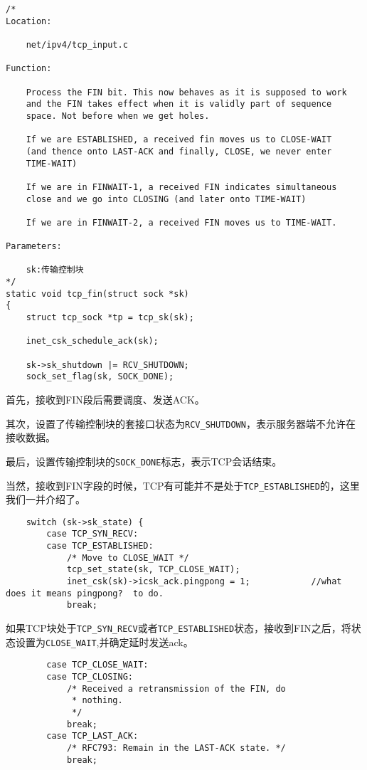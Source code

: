 \begin{verbatim}
/*
Location:

    net/ipv4/tcp_input.c

Function:

    Process the FIN bit. This now behaves as it is supposed to work
    and the FIN takes effect when it is validly part of sequence
    space. Not before when we get holes.
 
    If we are ESTABLISHED, a received fin moves us to CLOSE-WAIT
    (and thence onto LAST-ACK and finally, CLOSE, we never enter
    TIME-WAIT)
 
    If we are in FINWAIT-1, a received FIN indicates simultaneous
    close and we go into CLOSING (and later onto TIME-WAIT)
 
    If we are in FINWAIT-2, a received FIN moves us to TIME-WAIT.

Parameters:

    sk:传输控制块
*/
static void tcp_fin(struct sock *sk)
{
    struct tcp_sock *tp = tcp_sk(sk);

    inet_csk_schedule_ack(sk);

    sk->sk_shutdown |= RCV_SHUTDOWN;
    sock_set_flag(sk, SOCK_DONE);
\end{verbatim}

            首先，接收到FIN段后需要调度、发送ACK。

            其次，设置了传输控制块的套接口状态为\texttt{RCV_SHUTDOWN}，表示服务器端不允许在接收数据。
    
            最后，设置传输控制块的\texttt{SOCK_DONE}标志，表示TCP会话结束。

            当然，接收到FIN字段的时候，TCP有可能并不是处于\texttt{TCP_ESTABLISHED}的，这里我们一并介绍了。

\begin{verbatim}
    switch (sk->sk_state) {
        case TCP_SYN_RECV:
        case TCP_ESTABLISHED:
            /* Move to CLOSE_WAIT */
            tcp_set_state(sk, TCP_CLOSE_WAIT);
            inet_csk(sk)->icsk_ack.pingpong = 1;            //what does it means pingpong?  to do.
            break;
\end{verbatim}

            如果TCP块处于\texttt{TCP_SYN_RECV}或者\texttt{TCP_ESTABLISHED}状态，接收到FIN之后，将状态设置为\texttt{CLOSE_WAIT},并确定延时发送ack。
\begin{verbatim}
        case TCP_CLOSE_WAIT:
        case TCP_CLOSING:
            /* Received a retransmission of the FIN, do
             * nothing.
             */
            break;
        case TCP_LAST_ACK:
            /* RFC793: Remain in the LAST-ACK state. */
            break;
\end{verbatim}

